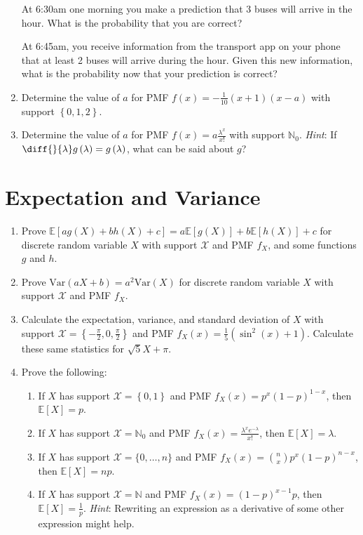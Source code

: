 \documentclass{article}
\begin{document}
\begin{enumerate}
    At 6:30am one morning you make a prediction that 3 buses will arrive in the hour. What is the probability that you are correct?

    At 6:45am, you receive information from the transport app on your phone that at least 2 buses will arrive during the hour. Given this new information, what is the probability now that your prediction is correct?
    \item Determine the value of \(a\) for PMF \(f\left(x\right) = -\frac{1}{10}\left(x + 1\right)\left(x - a\right)\) with support \(\left\{0, 1, 2\right\}\).
    \item Determine the value of \(a\) for PMF \(f\left(x\right) = a\frac{\lambda^x}{x!}\) with support \(\mathbb{N}_0\). \textit{Hint}: If \(\diff{}{\lambda}g\left(\lambda\right) = g\left(\lambda\right)\), what can be said about \(g\)?
\end{enumerate}

\section{Expectation and Variance}

\begin{enumerate}
    \item Prove \(\mathbb{E}\left[ag\left(X\right) + bh\left(X\right) + c\right] = a\mathbb{E}\left[g\left(X\right)\right] + b\mathbb{E}\left[h\left(X\right)\right] + c\) for discrete random variable \(X\) with support \(\mathcal{X}\) and PMF \(f_X\), and some functions \(g\) and \(h\).
    \item Prove \(\textrm{Var}\left(aX + b\right) = a^2\textrm{Var}\left(X\right)\) for discrete random variable \(X\) with support \(\mathcal{X}\) and PMF \(f_X\).
    \item Calculate the expectation, variance, and standard deviation of \(X\) with support \(\mathcal{X} = \left\{-\frac{\pi}{2}, 0, \frac{\pi}{2}\right\}\) and PMF \(f_X\left(x\right) = \frac{1}{5}\left(\sin^2\left(x\right) + 1\right)\). Calculate these same statistics for \(\sqrt{5}X + \pi\).
    \item Prove the following:
    \begin{enumerate}
        \item If \(X\) has support \(\mathcal{X} = \left\{0, 1\right\}\) and PMF \(f_X\left(x\right) = p^x\left(1 - p\right)^{1 - x}\), then \(\mathbb{E}\left[X\right] = p\).
        \item If \(X\) has support \(\mathcal{X} = \mathbb{N}_0\) and PMF \(f_X\left(x\right) = \frac{\lambda^x e^{-\lambda}}{x!}\), then \(\mathbb{E}\left[X\right] = \lambda\).
        \item If \(X\) has support \(\mathcal{X} = \{0,\dots, n\}\) and PMF \(f_X\left(x\right) = \binom{n}{x}p^x\left(1 - p\right)^{n - x}\), then \(\mathbb{E}\left[X\right] = np\).
        \item If \(X\) has support \(\mathcal{X} = \mathbb{N}\) and PMF \(f_X\left(x\right) = \left(1 - p\right)^{x - 1}p\), then \(\mathbb{E}\left[X\right] = \frac{1}{p}\). \textit{Hint}: Rewriting an expression as a derivative of some other expression might help.
    \end{enumerate}
\end{enumerate}
\end{document}

